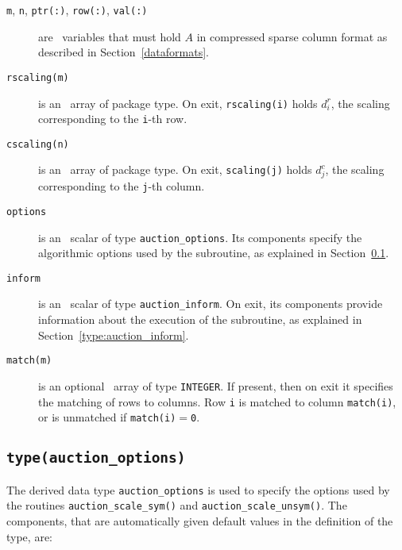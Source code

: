 \begin{description}

\item[\texttt{m}, \texttt{n}, \texttt{ptr(:)}, \texttt{row(:)}, \texttt{val(:)}] are \intentin\ variables that must hold $A$ in compressed sparse column format as described in Section~\ref{dataformats}.

\item[\texttt{rscaling(m)}] is an \intentout\ array of package type. On exit,
\texttt{rscaling(i)} holds $d^r_i$, the scaling corresponding to
the \texttt{i}-th row.

\item[\texttt{cscaling(n)}] is an \intentout\ array of package type. On exit,
\texttt{scaling(j)} holds $d^c_j$, the scaling corresponding to
the \texttt{j}-th column.

\item[\texttt{options}] is an \intentin\ scalar of type \texttt{auction\_options}. Its components specify the algorithmic options used by the subroutine, as explained in Section~\ref{type:auction_options}.

\item[\texttt{inform}] is an \intentout\ scalar of type \texttt{auction\_inform}. On exit, its components provide information about the execution of the subroutine, as explained in Section~\ref{type:auction_inform}.

\item[\texttt{match(m)}] is an optional \intentout\ array of type {\tt INTEGER}.
If present, then on exit it specifies the matching of rows to columns.
Row \texttt{i} is matched to column \texttt{match(i)}, or is unmatched
if \texttt{match(i)}$=$\texttt{0}.

\end{description}

\subsection{\texttt{type(auction\_options)}} \label{type:auction_options}

The derived data type \texttt{auction\_options} is used to specify the options
used by the routines \texttt{auction\_scale\_sym()} and \texttt{auction\_scale\_unsym()}. The components, that
are automatically given default values in the definition of the type, are:

